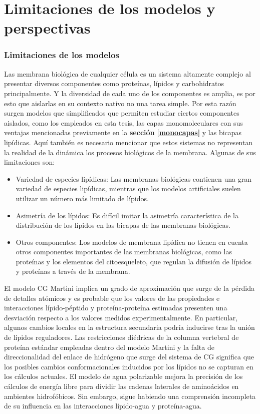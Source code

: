 \chapter{Limitaciones de los modelos y perspectivas}


\subsection{Limitaciones de los modelos}

Las membrana biológica de cualquier célula es un sistema altamente complejo al presentar diversos componentes como proteínas, lípidos y carbohidratos principalmente. Y la diversidad de cada uno de los componentes es amplia, es por esto que aislarlas en su contexto nativo no una tarea simple. Por esta razón surgen modelos que simplificados que permiten estudiar ciertos componentes aislados, como los empleados en esta tesis, las capas monomoleculares con sus ventajas mencionadas previamente en la \textbf{sección} \textbf{\ref{monocapas}} y las bicapas lipídicas. Aquí también es necesario mencionar que estos sistemas no representan la realidad de la dinámica los procesos biológicos de la membrana. Algunas de sus limitaciones son: 

\begin{itemize}
\item{Variedad de especies lipídicas: Las membranas biológicas contienen una gran variedad de especies lipídicas, mientras que los modelos artificiales suelen utilizar un número más limitado de lípidos.}

\item{Asimetría de los lípidos: Es difícil imitar la asimetría característica de la distribución de los lípidos en las bicapas de las membranas biológicas.}

\item{Otros componentes: Los modelos de membrana lipídica no tienen en cuenta otros componentes importantes de las membranas biológicas, como las proteínas y los elementos del citoesqueleto, que regulan la difusión de lípidos y proteínas a través de la membrana.}
\end{itemize}

El modelo CG Martini implica un grado de aproximación que surge de la pérdida de detalles atómicos y es probable que los valores de las propiedades e interacciones lípido-péptido y proteína-proteína estimadas presenten una desviación respecto a los valores medidos experimentalmente. En particular, algunos cambios locales en la estructura secundaria podría inducirse tras la unión de lípidos reguladores. Las restricciones diédricas de la columna vertebral de proteína estándar empleadas dentro del modelo Martini \citep{Risselada2009, Marrink2007} y la falta de direccionalidad del enlace de hidrógeno que surge del sistema de CG significa que los posibles cambios conformacionales inducidos por los lípidos no se capturan en los cálculos actuales. El modelo de agua polarizable \citep{Yesylevskyy2010} mejora la precisión de los cálculos de energía libre para dividir las cadenas laterales de aminoácidos en ambientes hidrofóbicos. Sin embargo, sigue habiendo una comprensión incompleta de su influencia en las interacciones lípido-agua y proteína-agua.


